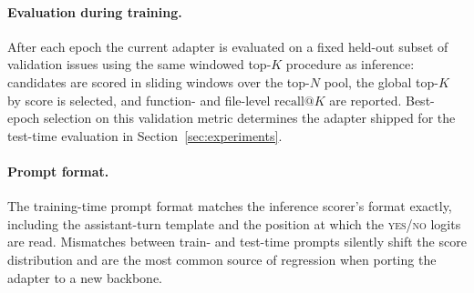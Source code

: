 \paragraph{Evaluation during training.}
After each epoch the current adapter is evaluated on a fixed
held-out subset of validation issues using the same windowed
top-$K$ procedure as inference: candidates are scored in sliding
windows over the top-$N$ pool, the global top-$K$ by score is
selected, and function- and file-level $\text{recall}@K$ are
reported. Best-epoch selection on this validation metric determines
the adapter shipped for the test-time evaluation in
Section~\ref{sec:experiments}.

\paragraph{Prompt format.}
The training-time prompt format matches the inference scorer's
format exactly, including the assistant-turn template and the
position at which the \textsc{yes}/\textsc{no} logits are read.
Mismatches between train- and test-time prompts silently shift the
score distribution and are the most common source of regression
when porting the adapter to a new backbone.

